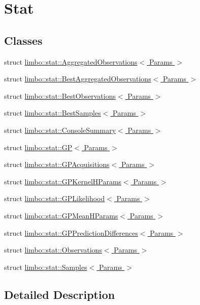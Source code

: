 \hypertarget{group__stat}{}\section{Stat}
\label{group__stat}
\subsection*{Classes}
\begin{DoxyCompactItemize}
\item 
struct \hyperlink{structlimbo_1_1stat_1_1_aggregated_observations}{limbo\+::stat\+::\+Aggregated\+Observations$<$ Params $>$}
\item 
struct \hyperlink{structlimbo_1_1stat_1_1_best_aggregated_observations}{limbo\+::stat\+::\+Best\+Aggregated\+Observations$<$ Params $>$}
\item 
struct \hyperlink{structlimbo_1_1stat_1_1_best_observations}{limbo\+::stat\+::\+Best\+Observations$<$ Params $>$}
\item 
struct \hyperlink{structlimbo_1_1stat_1_1_best_samples}{limbo\+::stat\+::\+Best\+Samples$<$ Params $>$}
\item 
struct \hyperlink{structlimbo_1_1stat_1_1_console_summary}{limbo\+::stat\+::\+Console\+Summary$<$ Params $>$}
\item 
struct \hyperlink{structlimbo_1_1stat_1_1_g_p}{limbo\+::stat\+::\+G\+P$<$ Params $>$}
\item 
struct \hyperlink{structlimbo_1_1stat_1_1_g_p_acquisitions}{limbo\+::stat\+::\+G\+P\+Acquisitions$<$ Params $>$}
\item 
struct \hyperlink{structlimbo_1_1stat_1_1_g_p_kernel_h_params}{limbo\+::stat\+::\+G\+P\+Kernel\+H\+Params$<$ Params $>$}
\item 
struct \hyperlink{structlimbo_1_1stat_1_1_g_p_likelihood}{limbo\+::stat\+::\+G\+P\+Likelihood$<$ Params $>$}
\item 
struct \hyperlink{structlimbo_1_1stat_1_1_g_p_mean_h_params}{limbo\+::stat\+::\+G\+P\+Mean\+H\+Params$<$ Params $>$}
\item 
struct \hyperlink{structlimbo_1_1stat_1_1_g_p_prediction_differences}{limbo\+::stat\+::\+G\+P\+Prediction\+Differences$<$ Params $>$}
\item 
struct \hyperlink{structlimbo_1_1stat_1_1_observations}{limbo\+::stat\+::\+Observations$<$ Params $>$}
\item 
struct \hyperlink{structlimbo_1_1stat_1_1_samples}{limbo\+::stat\+::\+Samples$<$ Params $>$}
\end{DoxyCompactItemize}


\subsection{Detailed Description}
